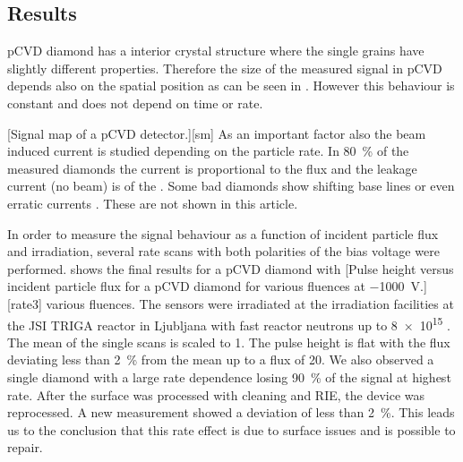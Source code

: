 \subsection{Results}
\ac{pCVD} diamond has a interior crystal structure where the single grains have slightly different properties. Therefore the size of the measured signal in \ac{pCVD} depends also on the spatial position as can be seen in . However this behaviour is constant and does not depend on time or rate.\par
{}[Signal map of a \ac{pCVD} detector.][sm]
As an important factor also the beam induced current is studied depending on the particle rate. In \SI{80}{\%} of the measured diamonds the current is proportional to the flux and the leakage current (no beam) is of the . Some bad diamonds show shifting base lines or even erratic currents \cite{erratic}. These are not shown in this article.\par
In order to measure the signal behaviour as a function of incident particle flux and irradiation, several rate scans with both polarities of the bias voltage were performed.  shows the final results for a \ac{pCVD} diamond with 
[Pulse height versus incident particle flux for a \ac{pCVD} diamond for various fluences at \SI{-1000}{\volt}.][rate3]
various fluences. The sensors were irradiated at the irradiation facilities at the JSI TRIGA reactor in Ljubljana with fast reactor neutrons up to \SI{8e15}{\ncm} \cite{irrad}. The mean of the single scans is scaled to 1. The pulse height is flat with the flux deviating less than \SI{2}{\%} from the mean up to a flux of \SI{20}{\mhzcm}. We also observed a single diamond with a large rate dependence losing \SI{90}{\%} of the signal at highest rate. After the surface was processed with cleaning and \ac{RIE}, the device was reprocessed. A new measurement showed a deviation of less than \SI{2}{\%}. This leads us to the conclusion that this rate effect is due to surface issues and is possible to repair.
